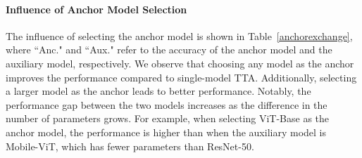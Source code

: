 \paragraph{Influence of Anchor Model Selection}
The influence of selecting the anchor model is shown in Table~\ref{anchorexchange}, where ``Anc." and ``Aux." refer to the accuracy of the anchor model and the auxiliary model, respectively. We observe that choosing any model as the anchor improves the performance compared to single-model TTA. Additionally, selecting a larger model as the anchor leads to better performance. Notably, the performance gap between the two models increases as the difference in the number of parameters grows. For example, when selecting ViT-Base as the anchor model, the performance is higher than when the auxiliary model is Mobile-ViT, which has fewer parameters than ResNet-50.
\begin{table}[t]
    \begin{center}
    \setlength{\tabcolsep}{9pt} %
    \renewcommand{\arraystretch}{1.1} %
    \begin{threeparttable}
    \end{threeparttable}
    \end{center}
    \vspace{-0.25in}
    \caption{Influence of anchor model selection. Each result represents the average performance across 15 types of corruption on ImageNet-C (\%). It is clear that selecting the larger model as the anchor leads to higher performance.}
    \label{anchorexchange}
    \vspace{-0.15in}
\end{table}





